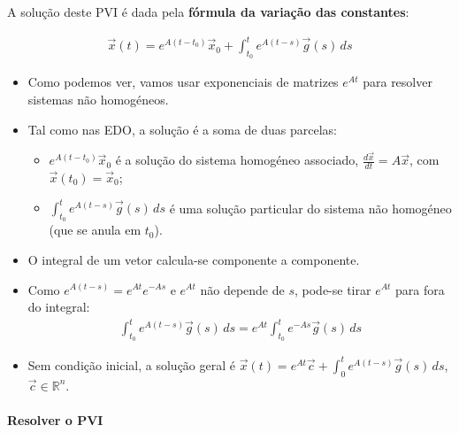 \documentclass{article}
\begin{document}
A solução deste PVI é dada pela \textbf{fórmula da variação das constantes}:

\begin{gather*}
\boxed{\vec{x}(t) = e^{A(t - t_0)}\vec{x}_0 + \int_{t_0}^{t} e^{A(t - s)}\vec{g}(s) \, ds}
\end{gather*}

\begin{itemize}
    \item Como podemos ver, vamos usar exponenciais de matrizes $e^{At}$ para resolver sistemas não homogéneos.
    \item Tal como nas EDO, a solução é a soma de duas parcelas:
    \begin{itemize}
        \item $e^{A(t - t_0)}\vec{x}_0$ é a solução do sistema homogéneo associado,
        $\frac{d\vec{x}}{dt} = A\vec{x}$, com $\vec{x}(t_0) = \vec{x}_0$;
        \item $\int_{t_0}^{t} e^{A(t - s)}\vec{g}(s) \, ds$ é uma solução particular do sistema não homogéneo
        (que se anula em $t_0$).
    \end{itemize}
    \item O integral de um vetor calcula-se componente a componente.
    \item Como $e^{A(t - s)} = e^{At}e^{-As}$ e $e^{At}$ não depende de $s$, pode-se tirar $e^{At}$ para fora
    do integral:
    \begin{gather*}
    \int_{t_0}^{t} e^{A(t - s)}\vec{g}(s) \, ds = e^{At} \int_{t_0}^{t} e^{-As}\vec{g}(s) \, ds
    \end{gather*}
    \item Sem condição inicial, a solução geral é
    $\vec{x}(t) = e^{At}\vec{c} + \int_{0}^{t} e^{A(t - s)}\vec{g}(s) \, ds$, $\vec{c} \in \mathbb{R}^n$.
\end{itemize}

\paragraph{Resolver o PVI}
\end{document}
